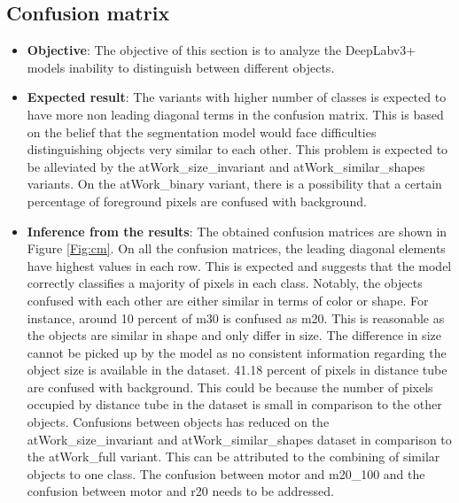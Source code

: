 	\subsection{Confusion matrix}
		\begin{itemize}
			\item \textbf{Objective}: The objective of this section is to analyze the DeepLabv3+ models inability to distinguish between different objects. 
			\item \textbf{Expected result}: The variants with higher number of classes is expected to have more non leading diagonal terms in the confusion matrix. This is based on the belief that the segmentation model would face difficulties distinguishing objects very similar to each other. This problem is expected to be alleviated by the atWork\_size\_invariant and atWork\_similar\_shapes variants. On the atWork\_binary variant, there is a possibility that a certain percentage of foreground pixels are confused with background.
			\item \textbf{Inference from the results}: The obtained confusion matrices are shown in Figure \ref{Fig:cm}. On all the confusion matrices, the leading diagonal elements have highest values in each row. This is expected and suggests that the model correctly classifies a majority of pixels in each class. Notably, the objects confused with each other are either similar in terms of color or shape. For instance, around 10 percent of m30 is confused as m20. This is reasonable as the objects are similar in shape and only differ in size. The difference in size cannot be picked up by the model as no consistent information regarding the object size is available in the dataset. 41.18 percent of pixels in distance tube are confused with background. This could be because the number of pixels occupied by distance tube in the dataset is small in comparison to the other objects.
			Confusions between objects has reduced on the atWork\_size\_invariant and atWork\_similar\_shapes dataset in comparison to the atWork\_full variant. This can be attributed to the combining of similar objects to one class. The confusion between motor and m20\_100 and the confusion between motor and r20 needs to be addressed.
		\end{itemize}

